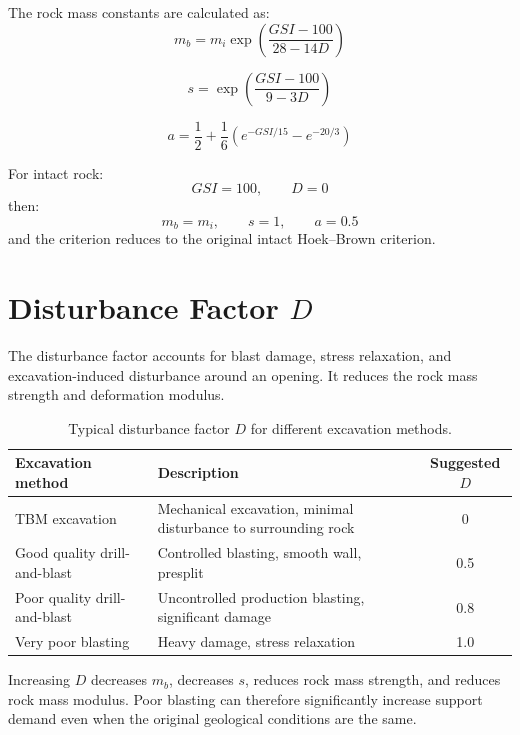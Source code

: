 \documentclass[a4paper,12pt]{article}
\begin{document}
The rock mass constants are calculated as:
\[
m_b =
m_i
\exp
\left(
\frac{GSI-100}{28-14D}
\right)
\]

\[
s =
\exp
\left(
\frac{GSI-100}{9-3D}
\right)
\]

\[
a =
\frac{1}{2}
+
\frac{1}{6}
\left(
e^{-GSI/15}
-
e^{-20/3}
\right)
\]

\begin{calcbox}
For intact rock:
\[
GSI=100,\qquad D=0
\]
then:
\[
m_b=m_i,\qquad s=1,\qquad a=0.5
\]
and the criterion reduces to the original intact Hoek--Brown criterion.
\end{calcbox}

\section{Disturbance Factor \(D\)}

The disturbance factor accounts for blast damage, stress relaxation, and excavation-induced
disturbance around an opening. It reduces the rock mass strength and deformation modulus.

\begin{table}[H]
\centering
\small
\begin{tabularx}{\textwidth}{l Y c}
\toprule
\textbf{Excavation method} & \textbf{Description} & \textbf{Suggested \(D\)} \\
\midrule
TBM excavation & Mechanical excavation, minimal disturbance to surrounding rock & 0 \\
Good quality drill-and-blast & Controlled blasting, smooth wall, presplit & 0.5 \\
Poor quality drill-and-blast & Uncontrolled production blasting, significant damage & 0.8 \\
Very poor blasting & Heavy damage, stress relaxation & 1.0 \\
\bottomrule
\end{tabularx}
\caption{Typical disturbance factor \(D\) for different excavation methods.}
\label{tab:Dfactor}
\end{table}

\begin{warnbox}
Increasing \(D\) decreases \(m_b\), decreases \(s\), reduces rock mass strength, and reduces
rock mass modulus. Poor blasting can therefore significantly increase support demand even
when the original geological conditions are the same.
\end{warnbox}
\end{document}
